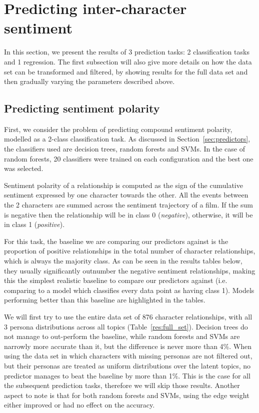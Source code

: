 \documentclass[bsc,frontabs,deptreport,singlespacing,parskip, twoside]{infthesis}
\begin{document}
\section{Predicting inter-character sentiment}

In this section, we present the results of 3 prediction tasks: 2 classification tasks and 1 regression. The first subsection will also give more details on how the data set can be transformed and filtered, by showing results for the full data set and then gradually varying the parameters described above.

\subsection{Predicting sentiment polarity}
First, we consider the problem of predicting compound sentiment polarity, modelled as a 2-class classification task. As discussed in Section~\ref{sec:predictors}, the classifiers used are decision trees, random forests and SVMs. In the case of random forests, 20 classifiers were trained on each configuration and the best one was selected.

Sentiment polarity of a relationship is computed as the sign of the cumulative sentiment expressed by one character towards the other. All the events between the 2 characters are summed across the sentiment trajectory of a film. If the sum is negative then the relationship will be in class 0 (\textit{negative}), otherwise, it will be in class 1 (\textit{positive}).

For this task, the baseline we are comparing our predictors against is the proportion of positive relationships in the total number of character relationships, which is always the majority class. As can be seen in the results tables below, they usually significantly outnumber the negative sentiment relationships, making this the simplest realistic baseline to compare our predictors against (i.e. comparing to a model which classifies every data point as having class 1). Models performing better than this baseline are highlighted in the tables.

We will first try to use the entire data set of 876 character relationships, with all 3 persona distributions across all topics (Table~\ref{res:full_set}). Decision trees do not manage to out-perform the baseline, while random forests and SVMs are narrowly more accurate than it, but the difference is never more than 4\%. When using the data set in which characters with missing personas are not filtered out, but their personas are treated as uniform distributions over the latent topics, no predictor manages to beat the baseline by more than 1\%. This is the case for all the subsequent prediction tasks, therefore we will skip those results. Another aspect to note is that for both random forests and SVMs, using the edge weight either improved or had no effect on the accuracy.
\end{document}
